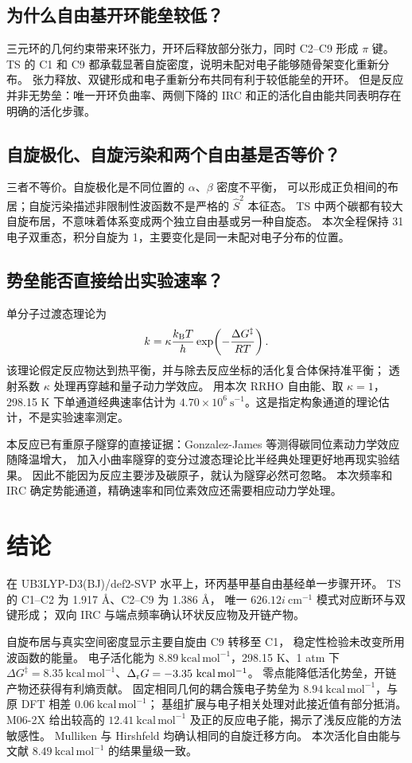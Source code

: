 \documentclass[UTF8,a4paper,12pt,fontset=fandol]{ctexart}
\newcommand{\kcal}{\mathrm{kcal\,mol^{-1}}}
\begin{document}
\subsection{为什么自由基开环能垒较低？}
三元环的几何约束带来环张力，开环后释放部分张力，同时 C2--C9 形成 $\pi$ 键。
TS 的 C1 和 C9 都承载显著自旋密度，说明未配对电子能够随骨架变化重新分布。
张力释放、双键形成和电子重新分布共同有利于较低能垒的开环。
但是反应并非无势垒：唯一开环负曲率、两侧下降的 IRC 和正的活化自由能共同表明存在明确的活化步骤。

\subsection{自旋极化、自旋污染和两个自由基是否等价？}
三者不等价。自旋极化是不同位置的 $\alpha$、$\beta$ 密度不平衡，
可以形成正负相间的布居；自旋污染描述非限制性波函数不是严格的 $\hat S^2$ 本征态。
TS 中两个碳都有较大自旋布居，不意味着体系变成两个独立自由基或另一种自旋态。
本次全程保持 31 电子双重态，积分自旋为 1，主要变化是同一未配对电子分布的位置。

\subsection{势垒能否直接给出实验速率？}
单分子过渡态理论为
\begin{equation}
k=\kappa\frac{k_{\rm B}T}{h}
\exp\!\left(-\frac{\Delta G^\ddagger}{RT}\right).
\end{equation}
该理论假定反应物达到热平衡，并与除去反应坐标的活化复合体保持准平衡；
透射系数 $\kappa$ 处理再穿越和量子动力学效应。
用本次 RRHO 自由能、取 $\kappa=1$，298.15 K 下单通道经典速率估计为
$4.70\times10^6\ \mathrm{s^{-1}}$。这是指定构象通道的理论估计，不是实验速率测定。

本反应已有重原子隧穿的直接证据：Gonzalez-James 等测得碳同位素动力学效应随降温增大，
加入小曲率隧穿的变分过渡态理论比半经典处理更好地再现实验结果\cite{tunneling}。
因此不能因为反应主要涉及碳原子，就认为隧穿必然可忽略。
本次频率和 IRC 确定势能通道，精确速率和同位素效应还需要相应动力学处理。

\section{结论}
在 UB3LYP-D3(BJ)/def2-SVP 水平上，环丙基甲基自由基经单一步骤开环。
TS 的 C1--C2 为 1.917 \AA、C2--C9 为 1.386 \AA，
唯一 $626.12i\ \mathrm{cm^{-1}}$ 模式对应断环与双键形成；
双向 IRC 与端点频率确认环状反应物及开链产物。

自旋布居与真实空间密度显示主要自旋由 C9 转移至 C1，
稳定性检验未改变所用波函数的能量。
电子活化能为 $8.89\ \kcal$，298.15 K、1 atm 下
$\Delta G^\ddagger=8.35\ \kcal$、$\Delta_{\rm r}G=-3.35\ \kcal$。
零点能降低活化势垒，开链产物还获得有利熵贡献。
固定相同几何的耦合簇电子势垒为 $8.94\ \kcal$，与原 DFT 相差 $0.06\ \kcal$；
基组扩展与电子相关处理对此接近值有部分抵消。
M06-2X 给出较高的 $12.41\ \kcal$ 及正的反应电子能，揭示了浅反应能的方法敏感性。
Mulliken 与 Hirshfeld 均确认相同的自旋迁移方向。
本次活化自由能与文献 $8.49\ \kcal$ 的结果量级一致。
\end{document}
